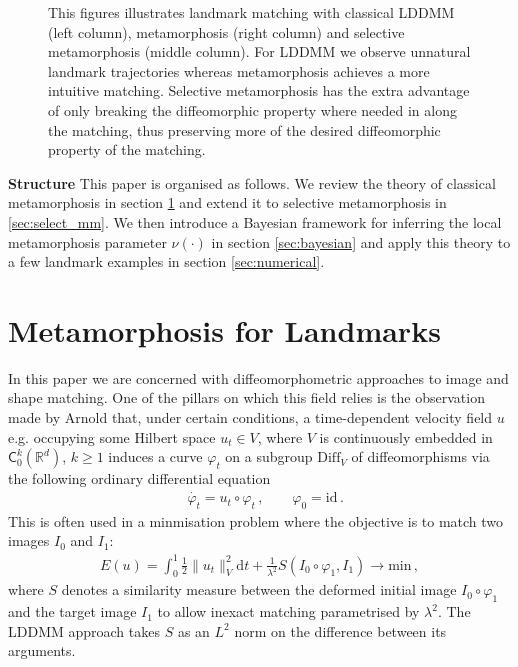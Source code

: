\documentclass[runningheads]{llncs}
\newcommand{\half}{\frac 12}
\newcommand{\norm}[2]{\| #1 \|_{ #2 }}
\newcommand{\vnorm}[1]{\norm{ #1 }{V}}
\newcommand{\diff}[1]{\text{d} #1}
\newcommand{\Rd}{\mathbb{R}^{d}}
\begin{document}
\begin{figure}
\begin{minipage}{\textwidth}
    \caption{This figures illustrates landmark matching with classical LDDMM
    (left column), metamorphosis (right column) and selective metamorphosis (middle
    column). For LDDMM we observe unnatural landmark trajectories whereas
    metamorphosis achieves a more intuitive matching. Selective metamorphosis
    has the extra advantage of only breaking the diffeomorphic property where
    needed in along the matching, thus preserving more of the desired
    diffeomorphic property of the matching.}
    \label{fig:mm_lddmm}
\end{minipage}
\end{figure}

{\bf Structure} This paper is organised as follows. We review the theory of
classical metamorphosis in section \ref{sec:bg} and extend it to selective
metamorphosis in \ref{sec:select_mm}.  We then introduce a Bayesian framework
for inferring the local metamorphosis parameter $\nu(\cdot)$ in section
\ref{sec:bayesian} and apply this theory to a few landmark examples in section
\ref{sec:numerical}.

\section{Metamorphosis for Landmarks}\label{sec:bg}

In this paper we are concerned with diffeomorphometric approaches to image and
shape matching. One of the pillars on which this field relies is the observation
made by Arnold \cite{arnold1966geometrie} that, under certain conditions, a
time-dependent velocity field $u$ e.g. occupying some Hilbert space $u_t \in V$,
where $V$ is continuously embedded in $\textsf{C}_0^k(\Rd)$, $k\geq 1$ induces a
curve $\varphi_t$ on a subgroup $\text{Diff}_V$ of diffeomorphisms
\cite{younes2010shapes} via the following ordinary differential equation
\begin{align}
& \dot{\varphi_t} = u_t \circ \varphi_t\, , \qquad  \varphi_0 = \text{id}\, . 
  \label{diffeo}
\end{align}
This is often used in a minmisation problem where the objective is to match two
images $I_0$ and $I_1$:
\begin{align}
  E(u) = \int_0^1 \half\vnorm{u_t}^2 \diff{t} + \frac{1}{\lambda^2}
  S(I_0\circ\varphi_1, I_1)\longrightarrow \text{min}\, , \label{E-def}
\end{align}
where $S$ denotes a similarity measure between the deformed initial image
$I_0\circ \varphi_1$ and the target image $I_1$ to allow inexact matching
parametrised by $\lambda^2$. The LDDMM approach takes $S$ as an $L^2$ norm on
the difference between its arguments.\\
\end{document}

